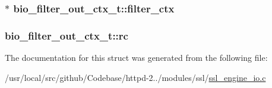 \subsubsection[{\texorpdfstring{filter\+\_\+ctx}{filter_ctx}}]{$\ast$ bio\+\_\+filter\+\_\+out\+\_\+ctx\+\_\+t\+::filter\+\_\+ctx}\hypertarget{structbio__filter__out__ctx__t_a8caf62368a6387766aedf185d589632e}{}\label{structbio__filter__out__ctx__t_a8caf62368a6387766aedf185d589632e}
\subsubsection[{\texorpdfstring{rc}{rc}}]{ bio\+\_\+filter\+\_\+out\+\_\+ctx\+\_\+t\+::rc}\hypertarget{structbio__filter__out__ctx__t_a6e4c25c9bbd1afecf0114bea2001ce41}{}\label{structbio__filter__out__ctx__t_a6e4c25c9bbd1afecf0114bea2001ce41}


The documentation for this struct was generated from the following file\+:\begin{DoxyCompactItemize}
\item 
/usr/local/src/github/\+Codebase/httpd-\/2../modules/ssl/\hyperlink{ssl__engine__io_8c}{ssl\+\_\+engine\+\_\+io.\+c}\end{DoxyCompactItemize}
